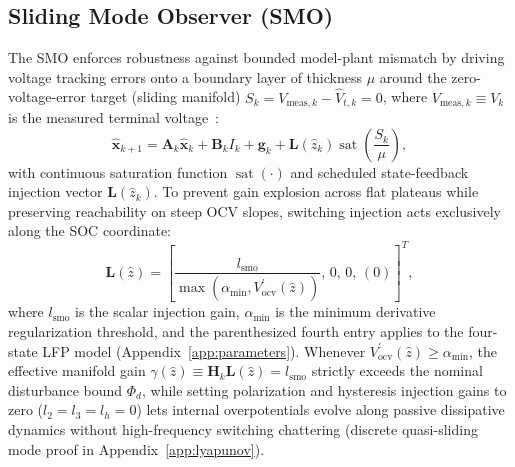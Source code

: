 \documentclass[11pt,a4paper]{article}
\begin{document}
\subsection{Sliding Mode Observer (SMO)}
The SMO enforces robustness against bounded model-plant mismatch by driving voltage tracking errors onto a boundary layer of thickness $\mu$ around the zero-voltage-error target (sliding manifold) $S_k = V_{\text{meas},k} - \hat{V}_{t,k} = 0$, where $V_{\text{meas},k} \equiv V_k$ is the measured terminal voltage~\cite{Chen2016smo,Huangfu2018smo}:
\begin{equation}\label{eqn:smo_state_eq}
\hat{\mathbf{x}}_{k+1} = \mathbf{A}_k \hat{\mathbf{x}}_k + \mathbf{B}_k I_k + \mathbf{g}_k + \mathbf{L}(\hat{z}_k) \operatorname{sat}\left( \frac{S_k}{\mu} \right),
\end{equation}
with continuous saturation function $\operatorname{sat}(\cdot)$ and scheduled state-feedback injection vector $\mathbf{L}(\hat{z}_k)$. To prevent gain explosion across flat plateaus while preserving reachability on steep OCV slopes, switching injection acts exclusively along the SOC coordinate:
\begin{equation}
\mathbf{L}(\hat{z}) = \left[\frac{l_{\text{smo}}}{\max(\alpha_{\min}, V_{\text{ocv}}^\prime(\hat{z}))},\, 0,\, 0,\, (0)\right]^T,
\end{equation}
where $l_{\text{smo}}$ is the scalar injection gain, $\alpha_{\min}$ is the minimum derivative regularization threshold, and the parenthesized fourth entry applies to the four-state LFP model (Appendix~\ref{app:parameters}). Whenever $V_{\text{ocv}}^\prime(\hat{z}) \ge \alpha_{\min}$, the effective manifold gain $\gamma(\hat{z}) \equiv \mathbf{H}_k\mathbf{L}(\hat{z}) = l_{\text{smo}}$ strictly exceeds the nominal disturbance bound $\Phi_d$, while setting polarization and hysteresis injection gains to zero ($l_2 = l_3 = l_h = 0$) lets internal overpotentials evolve along passive dissipative dynamics without high-frequency switching chattering (discrete quasi-sliding mode proof in Appendix~\ref{app:lyapunov}).
\end{document}
